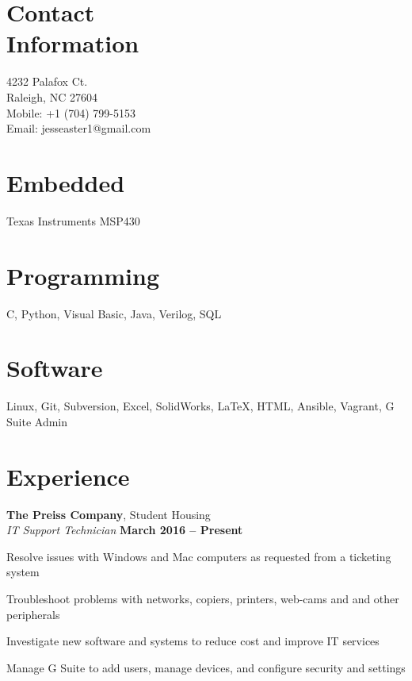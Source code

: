 \documentclass[margin,line]{resume}
\begin{document}
\begin{resume}

    \section{\mysidestyle Contact\\Information}

    4232 Palafox Ct.
    \\
    Raleigh, NC 27604
    \\
    Mobile: +1 (704) 799-5153
    \\
    Email: jesseaster1@gmail.com



    \section{\mysidestyle Embedded}
    Texas Instruments MSP430
    \vspace{-5mm}
    
    \section{\mysidestyle Programming}
    C, Python, Visual Basic, Java, Verilog, SQL
    \vspace{-5mm}

    \section{\mysidestyle Software}
    Linux, Git, Subversion, Excel, SolidWorks, \LaTeX, HTML, Ansible, Vagrant, G Suite Admin

    \section{\mysidestyle Experience}


    \textbf{The Preiss Company}, Student Housing\\
    \textsl{IT Support Technician}  \hfill \textbf{March 2016 -- Present}\\
    \vspace{-4mm}
    \begin{list2}
    \item Resolve issues with Windows and Mac computers as requested from a ticketing system
    \item Troubleshoot problems with networks, copiers, printers, web-cams and and other peripherals
    \item Investigate new software and systems to reduce cost and improve IT services
    \item  Manage G Suite to add users, manage devices, and configure security and settings


\end{list2}
\end{resume}
\end{document}
